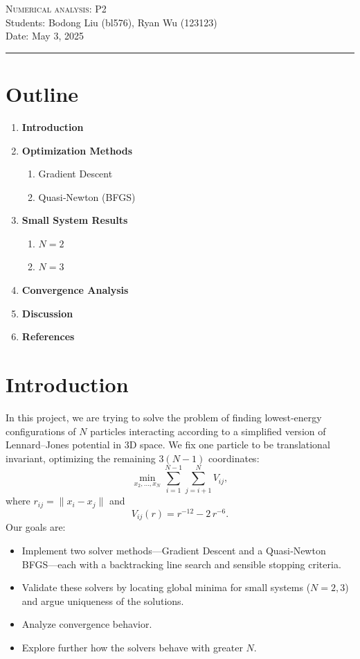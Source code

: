 \documentclass[11pt,onecolumn]{article}
\begin{document}
\noindent
\textsc{\Large Numerical analysis: P2}\\
Students: Bodong Liu (bl576), Ryan Wu (123123)\\
Date: May 3, 2025
\begin{center}\rule{1\linewidth}{0.5pt}\end{center}
\section*{Outline}
\begin{enumerate}
  \item \textbf{Introduction}

  \item \textbf{Optimization Methods}
    \begin{enumerate}
      \item Gradient Descent
      \item Quasi‑Newton (BFGS)
    \end{enumerate}

  \item \textbf{Small System Results}
    \begin{enumerate}
      \item $N=2$
      \item $N=3$
    \end{enumerate}
  
  \item \textbf{Convergence Analysis}

  \item \textbf{Discussion}

  \item \textbf{References}
\end{enumerate}

\newpage

\section{Introduction}
In this project, we are trying to solve the problem of finding lowest‐energy configurations of $N$ particles interacting according to a simplified version of Lennard–Jones potential in 3D space. We fix one particle to be translational invariant, optimizing the remaining $3(N-1)$ coordinates:
\[
  \min_{x_2,\ldots,x_N} \sum_{i=1}^{N-1}\sum_{j=i+1}^{N} V_{ij},
\]
where $r_{ij}=\|x_i - x_j\|$ and
\[
  V_{ij}(r) = r^{-12} - 2\,r^{-6}.
\]
Our goals are:
\begin{itemize}
  \item Implement two solver methods—Gradient Descent and a Quasi‑Newton BFGS—each with a backtracking line search and sensible stopping criteria.
  \item Validate these solvers by locating global minima for small systems ($N=2,3$) and argue uniqueness of the solutions.
  \item Analyze convergence behavior.
  \item Explore further how the solvers behave with greater $N$.
\end{itemize}
\end{document}
